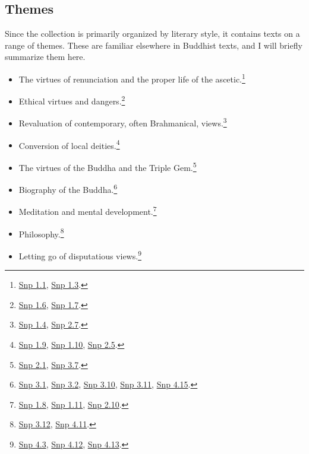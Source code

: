 \documentclass[12pt,openany]{book}%
\begin{document}
\subsection*{Themes}

Since the collection is primarily organized by literary style, it contains texts on a range of themes. These are familiar elsewhere in Buddhist texts, and I will briefly summarize them here.

\begin{itemize}%
\item The virtues of renunciation and the proper life of the ascetic.\footnote{\href{https://suttacentral.net/snp1.1/en/sujato}{Snp 1.1}, \href{https://suttacentral.net/snp1.3/en/sujato}{Snp 1.3}. }%
\item Ethical virtues and dangers.\footnote{\href{https://suttacentral.net/snp1.6/en/sujato}{Snp 1.6}, \href{https://suttacentral.net/snp1.7/en/sujato}{Snp 1.7}. }%
\item Revaluation of contemporary, often Brahmanical, views.\footnote{\href{https://suttacentral.net/snp1.4/en/sujato}{Snp 1.4}, \href{https://suttacentral.net/snp2.7/en/sujato}{Snp 2.7}. }%
\item Conversion of local deities.\footnote{\href{https://suttacentral.net/snp1.9/en/sujato}{Snp 1.9}, \href{https://suttacentral.net/snp1.10/en/sujato}{Snp 1.10}, \href{https://suttacentral.net/snp2.5/en/sujato}{Snp 2.5}. }%
\item The virtues of the Buddha and the Triple Gem.\footnote{\href{https://suttacentral.net/snp2.1/en/sujato}{Snp 2.1}, \href{https://suttacentral.net/snp3.7/en/sujato}{Snp 3.7}. }%
\item Biography of the Buddha.\footnote{\href{https://suttacentral.net/snp3.1/en/sujato}{Snp 3.1}, \href{https://suttacentral.net/snp3.2/en/sujato}{Snp 3.2}, \href{https://suttacentral.net/snp3.10/en/sujato}{Snp 3.10}, \href{https://suttacentral.net/snp3.11/en/sujato}{Snp 3.11}, \href{https://suttacentral.net/snp4.15/en/sujato}{Snp 4.15}. }%
\item Meditation and mental development.\footnote{\href{https://suttacentral.net/snp1.8/en/sujato}{Snp 1.8}, \href{https://suttacentral.net/snp1.11/en/sujato}{Snp 1.11}, \href{https://suttacentral.net/snp2.10/en/sujato}{Snp 2.10}. }%
\item Philosophy.\footnote{\href{https://suttacentral.net/snp3.12/en/sujato}{Snp 3.12}, \href{https://suttacentral.net/snp4.11/en/sujato}{Snp 4.11}. }%
\item Letting go of disputatious views.\footnote{\href{https://suttacentral.net/snp4.3/en/sujato}{Snp 4.3}, \href{https://suttacentral.net/snp4.12/en/sujato}{Snp 4.12}, \href{https://suttacentral.net/snp4.13/en/sujato}{Snp 4.13}. }%
\end{itemize}
\end{document}
